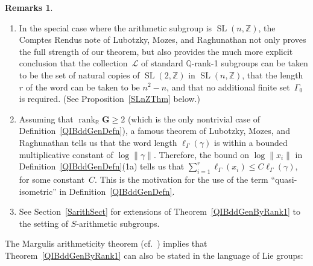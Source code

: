 \documentclass[11pt]{article}
\numberwithin{equation}{section}
\newcommand{\QQ}{\mathbb{Q}}
\newcommand{\RR}{\mathbb{R}}
\newcommand{\ZZ}{\mathbb{Z}}
\newcommand{\Ga}{\mathbf{G}}
\DeclareMathOperator{\rank}{rank}
\DeclareMathOperator{\SL}{SL}
\newcommand{\subgroups}{\mathcal{L}}
\numberwithin{equation}{section}
\theoremstyle{definition}
\newtheorem{rems}[thm]{Remarks}
\begin{document}
\begin{rems} \label{MainRems}
\leavevmode
\begin{enumerate}\itemsep=0pt
\item In the special case where the arithmetic subgroup is $\SL(n,\ZZ)$, the Comptes Rendus note of Lubotzky, Mozes, and Raghunathan \cite[Corollary~3]{MR1244421} not only proves the full strength of our theorem, but also provides the much more explicit conclusion that the collection~$\subgroups$ of standard $\QQ$-rank-1 subgroups can be taken to be the set of natural copies of $\SL(2,\ZZ)$ in $\SL(n,\ZZ)$, that the length~$r$ of the word can be taken to be $n^2 - n$, and that no additional finite set~$\Gamma_0$ is required. (See Proposition~\ref{SLnZThm} below.)
	
\item \label{MainRems-wordlength}Assuming that $\rank_\RR \Ga \ge 2$ (which is the only nontrivial case of Definition~\ref{QIBddGenDefn}), a famous theorem of Lubotzky, Mozes, and Raghunathan \cite[Theorem~A]{MR1828742} tells us that the word length $\ell_\Gamma(\gamma)$ is within a bounded multiplicative constant of $\log \| \gamma \|$. Therefore, the bound on $\log \|x_i\|$ in Definition~\ref{QIBddGenDefn}(1a) tells us that $\sum\limits_{i=1}^r \ell_\Gamma(x_i) \le C \ell_\Gamma(\gamma)$, for some constant~$C$. This is the motivation for the use of the term ``quasi-isometric'' in Definition~\ref{QIBddGenDefn}.
\item See Section~\ref{SarithSect} for extensions of Theorem~\ref{QIBddGenByRank1} to the setting of $S$-arithmetic subgroups.
\end{enumerate}
\end{rems}

The Margulis arithmeticity theorem (cf.\ \cite[Theorem~5.2.1, p.~90]{Morris-IntroArithGrps}) implies that Theorem~\ref{QIBddGenByRank1} can also be stated in the language of Lie groups:
\end{document}
